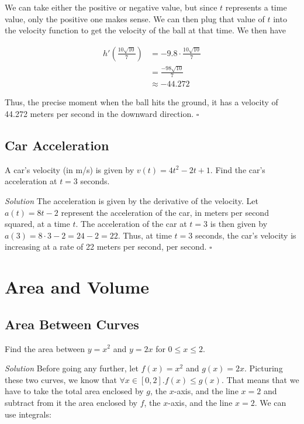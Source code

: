 \documentclass{article}
\begin{document}
We can take either the positive or negative value, but since \(t\) represents a
time value, only the positive one makes sense. We can then plug that value of
\(t\) into the velocity function to get the velocity of the ball at that time.
We then have

\[
  \begin{split}
    h'(\frac{10\sqrt{10}}{7})
    & = -9.8 \cdot \frac{10\sqrt{10}}{7} \\
    & = \frac{-98\sqrt{10}}{7} \\
    & \approx -44.272
  \end{split}
\]

Thus, the precise moment when the ball hits the ground, it has a velocity of
44.272 meters per second in the downward direction. \(\square\)

\subsection{Car Acceleration}

A car's velocity (in m/s) is given by \(v(t) = 4t^2 - 2t + 1\). Find the car's
acceleration at \(t = 3\) seconds.

\textit{Solution} \: The acceleration is given by the derivative of the
velocity. Let \(a(t) = 8t - 2\) represent the acceleration of the car, in
meters per second squared, at a time \(t\). The acceleration of the car at \(t
= 3\) is then given by \(a(3) = 8 \cdot 3 - 2 = 24 - 2 = 22\). Thus, at time
\(t = 3\) seconds, the car's velocity is increasing at a rate of 22 meters per
second, per second. \(\square\)

\section{Area and Volume}

\subsection{Area Between Curves}

Find the area between \(y = x^2\) and \(y = 2x\) for \(0 \leq x \leq 2\).

\textit{Solution} \: Before going any further, let \(f(x) = x^2\) and \(g(x) =
2x\). Picturing these two curves, we know that \(\forall x \in [0, 2]. f(x)
\leq g(x)\). That means that we have to take the total area enclosed by \(g\),
the \(x\)-axis, and the line \(x = 2\) and subtract from it the area enclosed
by \(f\), the \(x\)-axis, and the line \(x = 2\). We can use integrals:
\end{document}
